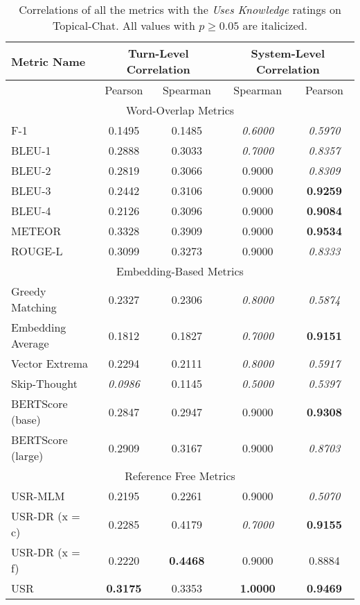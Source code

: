 \documentclass[11pt,a4paper]{article}
\begin{document}
\begin{table*}
    \centering
    \renewcommand*{\arraystretch}{1.2}
    \begin{tabular}{|l|c|c|c|c|}
    \hline
        \textbf{Metric Name} & \multicolumn{2}{|c|}{\textbf{Turn-Level Correlation}} & \multicolumn{2}{|c|}{\textbf{System-Level Correlation}}  \\ \hline
         & Pearson & Spearman & Spearman & Pearson \\ \hline
         \multicolumn{5}{|c|}{Word-Overlap Metrics} \\ \hline
F-1 & 0.1495 & 0.1485 & \textit{0.6000} & \textit{0.5970} \\
BLEU-1 & 0.2888 & 0.3033 & \textit{0.7000} & \textit{0.8357} \\
BLEU-2 & 0.2819 & 0.3066 & 0.9000 & \textit{0.8309} \\
BLEU-3 & 0.2442 & 0.3106 & 0.9000 & \textbf{0.9259} \\
BLEU-4 & 0.2126 & 0.3096 & 0.9000 & \textbf{0.9084} \\
METEOR & 0.3328 & 0.3909 & 0.9000 & \textbf{0.9534} \\
ROUGE-L & 0.3099 & 0.3273 & 0.9000 & \textit{0.8333} \\  \hline
\multicolumn{5}{|c|}{Embedding-Based Metrics} \\ \hline
Greedy Matching & 0.2327 & 0.2306 & \textit{0.8000} & \textit{0.5874} \\
Embedding Average & 0.1812 & 0.1827 & \textit{0.7000} & \textbf{0.9151} \\
Vector Extrema & 0.2294 & 0.2111 & \textit{0.8000} & \textit{0.5917} \\
Skip-Thought & \textit{0.0986} & 0.1145 & \textit{0.5000} & \textit{0.5397} \\
BERTScore (base) & 0.2847 & 0.2947 & 0.9000 & \textbf{0.9308} \\
BERTScore (large) & 0.2909 & 0.3167 & 0.9000 & \textit{0.8703} \\ \hline
\multicolumn{5}{|c|}{Reference Free Metrics} \\ \hline
USR-MLM & 0.2195 & 0.2261 & 0.9000 & \textit{0.5070} \\
USR-DR (x = c) & 0.2285 & 0.4179 & \textit{0.7000} & \textbf{0.9155} \\
USR-DR (x = f) & 0.2220 & \textbf{0.4468} & 0.9000 & 0.8884 \\
USR & \textbf{0.3175} & 0.3353 & \textbf{1.0000} & \textbf{0.9469} \\ \hline
    \end{tabular}
    \caption{Correlations of all the metrics with the \textit{Uses Knowledge} ratings on Topical-Chat. All values with $p \geq 0.05$ are italicized.}
    
\end{table*}
\end{document}
